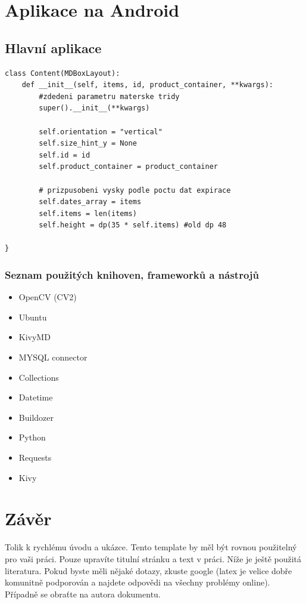 \documentclass[12pt, a4paper, oneside]{report}
\begin{document}
\chapter{Aplikace na Android}

\section{Hlavní aplikace}

\begin{lstlisting}[style=python]
class Content(MDBoxLayout):
    def __init__(self, items, id, product_container, **kwargs):
        #zdedeni parametru materske tridy
        super().__init__(**kwargs)

        self.orientation = "vertical"
        self.size_hint_y = None
        self.id = id
        self.product_container = product_container

        # prizpusobeni vysky podle poctu dat expirace
        self.dates_array = items
        self.items = len(items)
        self.height = dp(35 * self.items) #old dp 48

}
\end{lstlisting}

\clearpage

\subsection{Seznam použitých knihoven, frameworků a nástrojů}
\begin{itemize}
    \item OpenCV (CV2) \cite{opencv}
    \item Ubuntu \cite{ubuntu}
    \item KivyMD \cite{kivymd}
    \item MYSQL connector \cite{mysql-connector}
    \item Collections \cite{python-collections}
    \item Datetime \cite{python-datetime}
    \item Buildozer \cite{buildozer}
    \item Python \cite{python}
    \item Requests \cite{requests}
    \item Kivy \cite{kivy}
\end{itemize}

\chapter*{Závěr}
Tolik k rychlému úvodu a ukázce. Tento template by měl být rovnou použitelný pro vaši práci. Pouze upravíte titulní stránku a text v práci. Níže je ještě použitá literatura. Pokud byste měli nějaké dotazy, zkuste google (latex je velice dobře komunitně podporován a najdete odpovědi na všechny problémy online). Případně se obraťte na autora dokumentu.

\printbibliography
\end{document}
